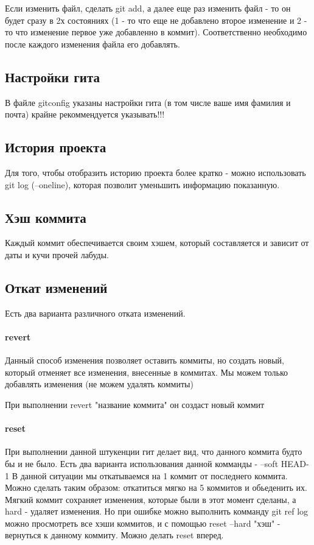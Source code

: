 \documentclass[a4paper,12pt]{article}
\begin{document}
Если изменить файл, сделать git add, а далее еще раз изменить файл - то он будет сразу в 2х состояниях (1 - то что еще не добавлено второе изменение и 2 - то что изменение первое уже добавленно в коммит). Соответственно необходимо после каждого изменения файла его добавлять. 

\subsection{Настройки гита}
В файле gitconfig указаны настройки гита (в том числе ваше имя фамилия и почта) крайне рекоммендуется указывать!!!
\subsection{История проекта}
Для того, чтобы отобразить историю проекта более кратко - можно использовать git log (--oneline), которая позволит уменьшить
информацию показанную. 
\subsection{Хэш коммита}
Каждый коммит обеспечивается своим хэшем, который составляется и зависит от даты и кучи прочей лабуды. 
\subsection{Откат изменений}
Есть два варианта различного отката изменений. 
\paragraph{revert}
Данный способ изменения позволяет оставить коммиты, но создать новый, который отменяет все изменения, внесенные в коммитах. Мы можем только добавлять изменения (не можем удалять коммиты)

При выполнении revert "название коммита" он создаст новый коммит
\paragraph{reset}
При выполнении данной штукенции гит делает вид, что данного коммита будто бы и не было. Есть два варианта использования данной комманды - --soft HEAD-1 В данной ситуации мы откатываемся на 1 коммит от последнего коммита. Можно сделать таким образом: откатиться мягко на 5 коммитов и обьеденить их. 
Мягкий коммит сохраняет изменения, которые были в этот момент сделаны, а hard - удаляет изменения. Но при ошибке можно выполнить комманду git ref log можно просмотреть все хэши коммитов, и с помощью reset --hard "хэш" - вернуться к данному коммиту. 
Можно делать reset вперед. 
\end{document}
